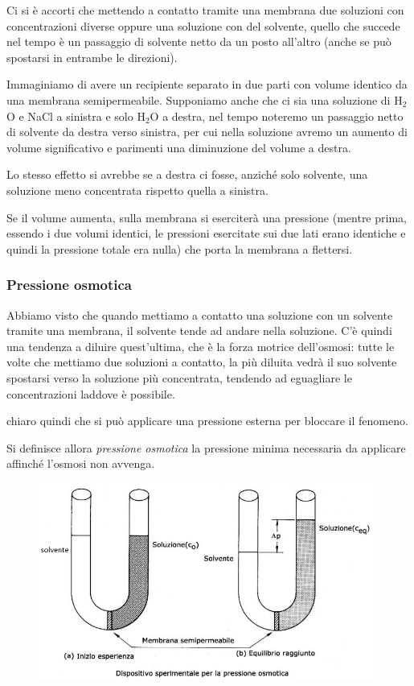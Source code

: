 \vspace{0.3cm}Ci si è accorti che mettendo a contatto tramite una membrana due soluzioni con concentrazioni diverse oppure una soluzione con del solvente, quello che succede nel tempo è un passaggio di solvente netto da un posto all'altro (anche se può spostarsi in entrambe le direzioni).

Immaginiamo di avere un recipiente separato in due parti con volume identico da una membrana semipermeabile. Supponiamo anche che ci sia una soluzione di H$_2$O e NaCl a sinistra e solo H$_2$O a destra, nel tempo noteremo un passaggio netto di solvente da destra verso sinistra, per cui nella soluzione avremo un aumento di volume significativo e parimenti una diminuzione del volume a destra.

Lo stesso effetto si avrebbe se a destra ci fosse, anziché solo solvente, una soluzione meno concentrata rispetto quella a sinistra.

Se il volume aumenta, sulla membrana si eserciterà una pressione (mentre prima, essendo i due volumi identici, le pressioni esercitate sui due lati erano identiche e quindi la pressione totale era nulla) che porta la membrana a flettersi.
\subsubsection{Pressione osmotica}
Abbiamo visto che quando mettiamo a contatto una soluzione con un solvente tramite una membrana, il solvente tende ad andare nella soluzione. C'è quindi una tendenza a diluire quest'ultima, che è la forza motrice dell'osmosi: tutte le volte che mettiamo due soluzioni a contatto, la più diluita vedrà il suo solvente spostarsi verso la soluzione più concentrata, tendendo ad eguagliare le concentrazioni laddove è possibile.

\E chiaro quindi che si può applicare una pressione esterna per bloccare il fenomeno.

Si definisce allora \textit{pressione osmotica} la pressione minima necessaria da applicare affinché l'osmosi non avvenga.

\begin{figure}[htp]
    \centering
    \includegraphics[width=11cm]{immagini/tubo_a_U.png}
\end{figure}

